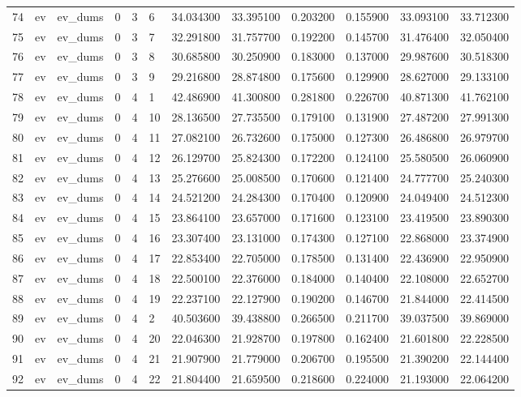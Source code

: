 \begin{tabular}{llllllrrrrrr}
74 & ev & ev_dums & 0 & 3 & 6 & 34.034300 & 33.395100 & 0.203200 & 0.155900 & 33.093100 & 33.712300 \\
75 & ev & ev_dums & 0 & 3 & 7 & 32.291800 & 31.757700 & 0.192200 & 0.145700 & 31.476400 & 32.050400 \\
76 & ev & ev_dums & 0 & 3 & 8 & 30.685800 & 30.250900 & 0.183000 & 0.137000 & 29.987600 & 30.518300 \\
77 & ev & ev_dums & 0 & 3 & 9 & 29.216800 & 28.874800 & 0.175600 & 0.129900 & 28.627000 & 29.133100 \\
78 & ev & ev_dums & 0 & 4 & 1 & 42.486900 & 41.300800 & 0.281800 & 0.226700 & 40.871300 & 41.762100 \\
79 & ev & ev_dums & 0 & 4 & 10 & 28.136500 & 27.735500 & 0.179100 & 0.131900 & 27.487200 & 27.991300 \\
80 & ev & ev_dums & 0 & 4 & 11 & 27.082100 & 26.732600 & 0.175000 & 0.127300 & 26.486800 & 26.979700 \\
81 & ev & ev_dums & 0 & 4 & 12 & 26.129700 & 25.824300 & 0.172200 & 0.124100 & 25.580500 & 26.060900 \\
82 & ev & ev_dums & 0 & 4 & 13 & 25.276600 & 25.008500 & 0.170600 & 0.121400 & 24.777700 & 25.240300 \\
83 & ev & ev_dums & 0 & 4 & 14 & 24.521200 & 24.284300 & 0.170400 & 0.120900 & 24.049400 & 24.512300 \\
84 & ev & ev_dums & 0 & 4 & 15 & 23.864100 & 23.657000 & 0.171600 & 0.123100 & 23.419500 & 23.890300 \\
85 & ev & ev_dums & 0 & 4 & 16 & 23.307400 & 23.131000 & 0.174300 & 0.127100 & 22.868000 & 23.374900 \\
86 & ev & ev_dums & 0 & 4 & 17 & 22.853400 & 22.705000 & 0.178500 & 0.131400 & 22.436900 & 22.950900 \\
87 & ev & ev_dums & 0 & 4 & 18 & 22.500100 & 22.376000 & 0.184000 & 0.140400 & 22.108000 & 22.652700 \\
88 & ev & ev_dums & 0 & 4 & 19 & 22.237100 & 22.127900 & 0.190200 & 0.146700 & 21.844000 & 22.414500 \\
89 & ev & ev_dums & 0 & 4 & 2 & 40.503600 & 39.438800 & 0.266500 & 0.211700 & 39.037500 & 39.869000 \\
90 & ev & ev_dums & 0 & 4 & 20 & 22.046300 & 21.928700 & 0.197800 & 0.162400 & 21.601800 & 22.228500 \\
91 & ev & ev_dums & 0 & 4 & 21 & 21.907900 & 21.779000 & 0.206700 & 0.195500 & 21.390200 & 22.144400 \\
92 & ev & ev_dums & 0 & 4 & 22 & 21.804400 & 21.659500 & 0.218600 & 0.224000 & 21.193000 & 22.064200 \\

\end{tabular}
